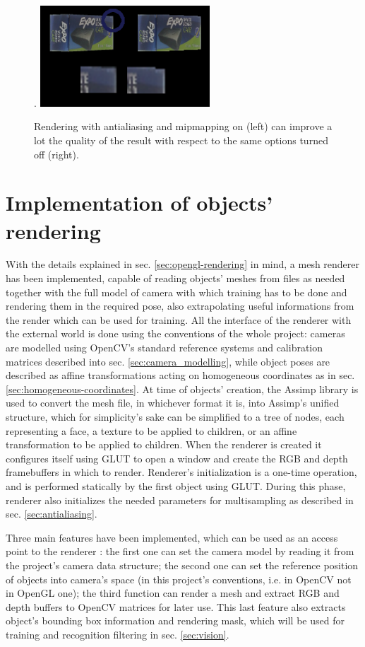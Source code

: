 \begin{figure}[htbp] \label{fig:multisampling-on}.
  \centering
  \includegraphics[width=2.5in]{./Results/antialiasing}
  \caption{Rendering with antialiasing and mipmapping on (left)
  can improve a lot the quality of the result with respect to the same options
turned off (right).}
\end{figure}

\section{Implementation of objects' rendering} \label{sec:renderer3d}
With the details explained in sec. \ref{sec:opengl-rendering} in mind, a mesh renderer has been implemented, capable of
reading objects' meshes from files as needed together with the full model of
camera with which training has to be done and rendering them in the required
pose, also extrapolating useful informations from the render which can be used
for training. All the interface of the renderer with the external world is done
using the conventions of the whole project: cameras are modelled using OpenCV's
standard reference systems and calibration matrices described into sec.
\ref{sec:camera_modelling}, while object poses are described as affine
transformations acting on homogeneous coordinates as in sec.
\ref{sec:homogeneous-coordinates}. At time of objects' creation, the Assimp library
is used to convert the mesh file, in whichever format it is, into Assimp's
unified structure, which for simplicity's sake can be simplified to a tree of
nodes, each representing a face, a texture to be applied to children, or
an affine transformation to be applied to children. When the renderer is created
it configures itself using GLUT to open a window and create the RGB and depth
framebuffers in which to render. Renderer's initialization is a one-time
operation, and is performed statically by the first object using GLUT. During
this phase, renderer also initializes the needed parameters for multisampling as
described in sec. \ref{sec:antialiasing}.

Three main features have been implemented, which can be used as an access point
to the renderer : the first one can set the
camera model by reading it from the project's camera data structure; the second
one can set the reference position of objects into camera's space (in this project's
conventions, i.e. in OpenCV not in OpenGL one); the third function can render a
mesh and extract RGB and depth buffers to OpenCV matrices for later use. This
last feature also extracts object's bounding box information and rendering mask,
which will be used for training and recognition filtering in sec.
\ref{sec:vision}.

